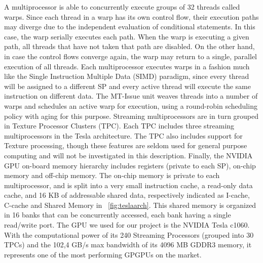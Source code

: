   A multiprocessor is able to concurrently execute groups of 32 threads called warps. Since each thread
in a warp has its own control flow, their execution paths may diverge due to the independent evaluation
of conditional statements. In this case, the warp serially executes each path. When the warp is executing
a given path, all threads that have not taken that path are disabled. On the other hand, in case the
control flows converge again, the warp may return to a single, parallel execution of all threads.\newline
 Each multiprocessor executes warps in a fashion much like the Single Instruction Multiple Data (SIMD)
paradigm, since every thread will be assigned to a different SP and every active thread will execute the
same instruction on different data.\newline
   The MT-Issue unit weaves threads into a number of warps and schedules an active warp for execution,
using a round-robin scheduling policy with aging for this purpose.\newline
   Streaming multiprocessors are in turn grouped in Texture Processor Clusters (TPC). Each TPC includes three streaming
multiprocessors in the Tesla architecture. The TPC also includes support for Texture processing, though these features are
seldom used for general purpose computing and will not be investigated in this description.\newline
   Finally, the NVIDIA GPU on-board memory hierarchy includes registers (private to each SP), on-chip memory and off-chip memory.
The on-chip memory is private to each multiprocessor, and is split into a very small instruction cache, a read-only data cache,
and 16 KB of addressable shared data, respectively indicated as I-cache, C-cache and Shared Memory in \figurename~\ref{fig:teslaarch}.
This shared memory is organized in 16 banks that can be concurrently accessed, each bank having a single read/write port.\newline
  The GPU we used for our project is the NVIDIA Tesla c1060. 
 With the computational power of its 240 Streaming Processors (grouped into 30 TPCs) and the 102,4 GB/s max bandwidth of its 4096 MB
GDDR3 memory, it represents one of the most performing GPGPUs on the market.\newline


